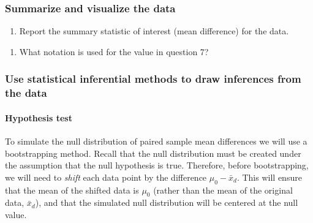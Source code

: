 \documentclass[
]{report}
\providecommand{\tightlist}{%
  \setlength{\itemsep}{0pt}\setlength{\parskip}{0pt}}
\begin{document}
\vspace{0.3in}

\hypertarget{summarize-and-visualize-the-data-2}{%
\subsubsection*{Summarize and visualize the data}\label{summarize-and-visualize-the-data-2}}

\begin{enumerate}
\def\labelenumi{\arabic{enumi}.}
\setcounter{enumi}{6}
\tightlist
\item
  Report the summary statistic of interest (mean difference) for the data.
\end{enumerate}

\vspace{0.3in}

\begin{enumerate}
\def\labelenumi{\arabic{enumi}.}
\setcounter{enumi}{7}
\tightlist
\item
  What notation is used for the value in question 7?
\end{enumerate}

\vspace{0.3in}

\hypertarget{use-statistical-inferential-methods-to-draw-inferences-from-the-data-1}{%
\subsubsection*{Use statistical inferential methods to draw inferences from the data}\label{use-statistical-inferential-methods-to-draw-inferences-from-the-data-1}}

\hypertarget{hypothesis-test}{%
\paragraph*{Hypothesis test}\label{hypothesis-test}}

To simulate the null distribution of paired sample mean differences we will use a bootstrapping method. Recall that the null distribution must be created under the assumption that the null hypothesis is true. Therefore, before bootstrapping, we will need to \emph{shift} each data point by the difference \(\mu_0 - \bar{x}_d\). This will ensure that the mean of the shifted data is \(\mu_0\) (rather than the mean of the original data, \(\bar{x}_d\)), and that the simulated null distribution will be centered at the null value.
\end{document}
